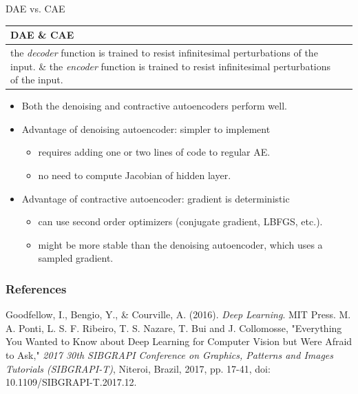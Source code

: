 \begin{frame}[t]{DAE vs. CAE}
    \begin{table}[h!]
        \centering
        \label{tab:}
        \begin{tabular}{p{5cm}|p{5cm}}
            \textbf{DAE} \& \textbf{CAE}\\
            \hline
            the \textit{decoder} function is trained to resist infinitesimal perturbations of the input. \& the \textit{encoder} function is trained to resist infinitesimal perturbations of the input.
        \end{tabular}
    \end{table}

\begin{itemize}
\item Both the denoising and contractive autoencoders perform well.
\item Advantage of denoising autoencoder: simpler to implement
\begin{itemize}
\item  requires adding one or two lines of code to regular AE.
\item  no need to compute Jacobian of hidden layer.
\end{itemize}
\item Advantage of contractive autoencoder: gradient is deterministic
\begin{itemize}
\item can use second order optimizers (conjugate gradient, LBFGS, etc.).
\item might be more stable than the denoising autoencoder, which uses a sampled gradient.
\end{itemize}

\end{itemize}

\end{frame}


\begin{vbframe}
\frametitle{References}
\footnotesize{
\begin{thebibliography}{99}
Goodfellow, I., Bengio, Y., \& Courville, A. (2016). \textit{Deep Learning}. MIT Press.
 M. A. Ponti, L. S. F. Ribeiro, T. S. Nazare, T. Bui and J. Collomosse, "Everything You Wanted to Know about Deep Learning for Computer Vision but Were Afraid to Ask," \textit{2017 30th SIBGRAPI Conference on Graphics, Patterns and Images Tutorials (SIBGRAPI-T)}, Niteroi, Brazil, 2017, pp. 17-41, doi: 10.1109/SIBGRAPI-T.2017.12.

\end{thebibliography}
}
\end{vbframe}


\endlecture

